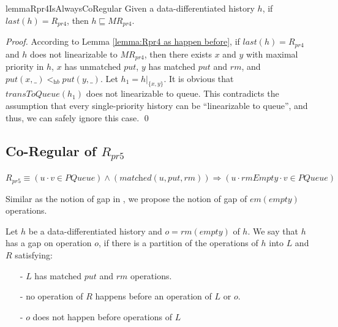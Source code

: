 \documentclass{llncs}
\begin{document}
\begin{restatable}{lemma}{Rpr4IsAlwaysCoRegular}
\label{lemma:Rpr4 is always co-regular}
Given a data-differentiated history $h$, if $\textit{last}(h) = R_{\textit{pr4}}$, then $h \sqsubseteq \textit{MR}_{\textit{pr4}}$.
\end{restatable}

\begin {proof}

According to Lemma \ref{lemma:Rpr4 as happen before}, if $\textit{last}(h) = R_{\textit{pr4}}$ and $h$ does not linearizable to $\textit{MR}_{\textit{pr4}}$, then there exists $x$ and $y$ with maximal priority in $h$, $x$ has unmatched $\textit{put}$, $y$ has matched $\textit{put}$ and $\textit{rm}$, and $\textit{put}(x,\_) <_{\textit{hb}} \textit{put}(y,\_)$. Let $h_1 = h \vert_{ \{ x,y \} }$. It is obvious that $\textit{transToQueue}(h_1)$ does not linearizable to queue. This contradicts the assumption that every single-priority history can be ``linearizable to queue'', and thus, we can safely ignore this case. \qed
\end {proof}




\subsection{Co-Regular of $R_{\textit{pr5}}$}
\label{subsec:co-regular of Rpr5}

$R_{\textit{pr5}} \equiv (u \cdot v \in \textit{PQueue}) \wedge (\textit{matched}(u,\textit{put},\textit{rm}) ) \Rightarrow (u \cdot \textit{rmEmpty} \cdot v \in \textit{PQueue})$

Similar as the notion of gap in \cite{Bouajjani:2015}, we propose the notion of gap of $\textit{em}(\textit{empty})$ operations.

\begin{definition}\label{def:gap for rmEmpty operations}

Let $h$ be a data-differentiated history and $o = \textit{rm}(\textit{empty})$ of $h$. We say that $h$ has a gap on operation $o$, if there is a partition of the operations of $h$ into $L$ and $R$ satisfying:
\begin{itemize}
\setlength{\itemsep}{0.5pt}
\item[-] $L$ has matched $\textit{put}$ and $\textit{rm}$ operations.

\item[-] no operation of $R$ happens before an operation of $L$ or $o$.

\item[-] $o$ does not happen before operations of $L$
\end{itemize}
\end{definition}
\end{document}
